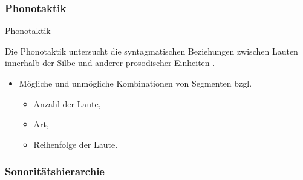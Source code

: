 \begin{frame}
\frametitle{Phonotaktik}

\begin{block}{Phonotaktik}

Die Phonotaktik untersucht die syntagmatischen Beziehungen zwischen Lauten innerhalb der Silbe und anderer prosodischer Einheiten \citep{Fuhrhop&Co13a}.

\end{block}

\begin{itemize}
	\item Mögliche und unmögliche Kombinationen von Segmenten bzgl.
	
	\begin{itemize}
		\item Anzahl der Laute,
		\item Art,
		\item Reihenfolge der Laute.
	\end{itemize}

\end{itemize}

\end{frame}



\subsubsection{Sonoritätshierarchie}

